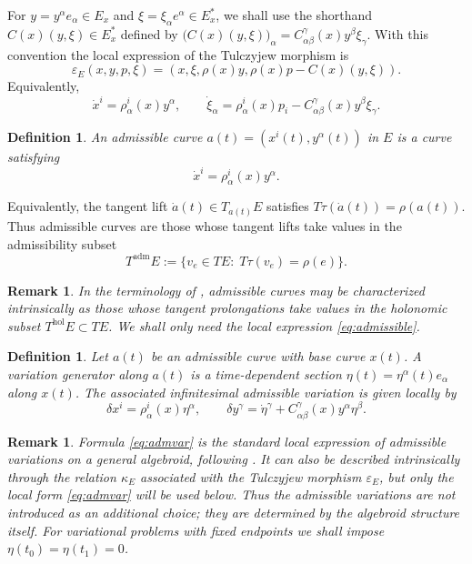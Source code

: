 \documentclass[11pt]{article}
\newtheorem{definition}[theorem]{Definition}
\newtheorem{remark}[theorem]{Remark}
\begin{document}
For \(y=y^\alpha e_\alpha\in E_x\) and
\(\xi=\xi_\alpha e^\alpha\in E_x^*\), we shall use the shorthand
\(C(x)(y,\xi)\in E_x^*\) defined by
$\bigl(C(x)(y,\xi)\bigr)_\alpha
        =
        C^\gamma_{\alpha\beta}(x)y^\beta\xi_\gamma$. With this convention the local expression of the Tulczyjew morphism is
\begin{equation}
\varepsilon_E(x,y,p,\xi)
=
(x,\xi,\rho(x)y,\rho(x)p-C(x)(y,\xi)).
\label{eq:epsE}
\end{equation}
Equivalently,
\[
\dot x^i=\rho^i_\alpha(x)y^\alpha,
\qquad
\dot \xi_\alpha=\rho^i_\alpha(x)p_i-C^\gamma_{\alpha\beta}(x)y^\beta\xi_\gamma.
\]

\begin{definition}
An \emph{admissible curve} \(a(t)=(x^i(t),y^\alpha(t))\) in \(E\) is a
curve satisfying
\begin{equation}
        \dot x^i
        =
        \rho^i_{\alpha}(x)y^\alpha .
\label{eq:admissible}
\end{equation}
\end{definition}

Equivalently, the tangent lift \(\dot a(t)\in T_{a(t)}E\) satisfies $T\tau(\dot a(t))=\rho(a(t))$. Thus admissible curves are those whose tangent lifts take values in the
admissibility subset
\[
T^{\mathrm{adm}}E
:=\{v_e\in TE:\;T\tau(v_e)=\rho(e)\}.
\]
\begin{remark}
In the terminology of \cite{GG2008}, admissible curves
may be characterized intrinsically as those whose tangent prolongations take values in the holonomic subset \(T^{\mathrm{hol}}E\subset TE\). We shall
only need the local expression \eqref{eq:admissible}.
\end{remark}

\begin{definition}\label{var}
Let \(a(t)\) be an admissible curve with base curve \(x(t)\). A
\emph{variation generator} along \(a(t)\) is a time-dependent section $\eta(t)=\eta^\alpha(t)e_\alpha$ along \(x(t)\). The associated infinitesimal admissible variation is given
locally by
\begin{equation}
        \delta x^i
        =
        \rho^i_{\alpha}(x)\eta^\alpha,
        \qquad
        \delta y^\gamma
        =
        \dot\eta^\gamma
        +
        C^\gamma_{\alpha\beta}(x)y^\alpha\eta^\beta .
\label{eq:admvar}
\end{equation}
\end{definition}

\begin{remark}
Formula \eqref{eq:admvar} is the standard local expression of admissible variations
on a general algebroid, following \cite{GG2008}.
It can also be described intrinsically through the relation $\kappa_E$
associated with the Tulczyjew morphism $\varepsilon_E$, but only the
local form \eqref{eq:admvar} will be used below. Thus the admissible
variations are not introduced as an additional choice; they are determined by the algebroid structure itself. For variational problems with fixed
endpoints we shall impose $\eta(t_0)=\eta(t_1)=0$.
\end{remark}
\end{document}
